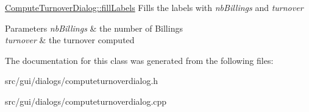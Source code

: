 \hyperlink{classGui_1_1Dialogs_1_1ComputeTurnoverDialog_a34de3e4d4504108ad4954a64b4101546}{Compute\+Turnover\+Dialog\+::fill\+Labels} Fills the labels with {\itshape nb\+Billings} and {\itshape turnover} 


\begin{DoxyParams}{Parameters}
{\em nb\+Billings} & the number of Billings \\
\hline
{\em turnover} & the turnover computed \\
\hline
\end{DoxyParams}


The documentation for this class was generated from the following files\+:\begin{DoxyCompactItemize}
\item 
src/gui/dialogs/computeturnoverdialog.\+h\item 
src/gui/dialogs/computeturnoverdialog.\+cpp\end{DoxyCompactItemize}

